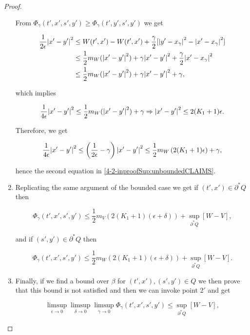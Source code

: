 \begin{proof}
\begin{enumerate}[label=\arabic*')]
        From $\Phi_{\gamma}(t',x',s',y')\geq\Phi_{\gamma}(t',y',s',y')$ we get

        \begin{align*}
            \frac{1}{2\epsilon}\abs{x'-y'}^2 & \leq W(t',x')-W(t',x') + \frac{\gamma}{2}[\abs{y'-x_{\gamma}}^2-\abs{x'-x_{\gamma}}^2] \\
            & \leq \frac{1}{2}m_W(\abs{x'-y'}^2) + \gamma\abs{x'-y'}^2 + \frac{\gamma}{2}\abs{x'-x_{\gamma}}^2 \\
            & \leq \frac{1}{2}m_W(\abs{x'-y'}^2) + \gamma\abs{x'-y'}^2 + \gamma,
        \end{align*}

        which implies

        \[\frac{1}{4\epsilon}\abs{x'-y'}^2\leq \frac{1}{2}m_W(\abs{x'-y'}^2)+\gamma\Rightarrow \abs{x'-y'}^2\leq 2(K_1+1)\epsilon.\]

        Therefore, we get

        \[\frac{1}{4\epsilon}\abs{x'-y'}^2\leq \left(\frac{1}{2\epsilon}-\gamma\right)\abs{x'-y'}^2\leq \frac{1}{2}m_W\left(2(K_1+1)\epsilon\right)+\gamma,\]

        hence the second equation in \ref{4-2-inproofSup:unboundedCLAIMS}.

        \item Replicating the same argument of the bounded case we get if $(t',x')\in\partial^{\ast}Q$ then
        
        \begin{equation}
            \Phi_{\gamma}(t',x',s',y') \leq \frac{1}{2}m_V\left(2(K_1+1)(\epsilon+\delta)\right) + \sup_{\partial^{\ast}Q}[W-V],
        \end{equation}

        and if $(s',y')\in\partial^{\ast}Q$ then

        \begin{equation}
            \Phi_{\gamma}(t',x',s',y') \leq \frac{1}{2}m_W\left(2(K_1+1)(\epsilon+\delta)\right) + \sup_{\partial^{\ast}Q}[W-V].
        \end{equation}

        \item Finally, if we find a bound over $\beta$ for $(t',x'),(s',y')\in Q$ we then prove that this bound is not satisfied and then we can invoke 
        point $2'$ and get

        \begin{equation}
            \limsup_{\epsilon\to0}\limsup_{\delta\to0}\limsup_{\gamma\to0}\Phi_{\gamma}(t',x',s',y') \leq \sup_{\partial^{\ast}Q}[W-V],
        \end{equation}


\end{enumerate}
\end{proof}
